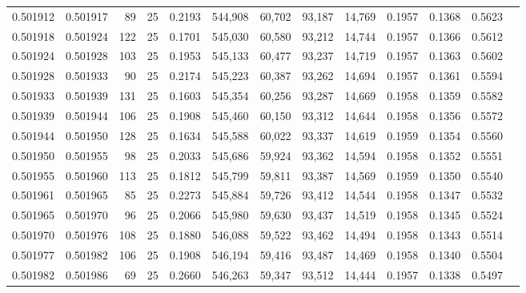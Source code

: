 \begin{tabular}{rrrrrrrrrrrrr}
0.501912 & 0.501917 &  89 &  25 &                                     0.2193 & 544,908 &  60,702 &  93,187 &  14,769 & 0.1957 & 0.1368 & 0.5623 \\
0.501918 & 0.501924 & 122 &  25 &                                     0.1701 & 545,030 &  60,580 &  93,212 &  14,744 & 0.1957 & 0.1366 & 0.5612 \\
0.501924 & 0.501928 & 103 &  25 &                                     0.1953 & 545,133 &  60,477 &  93,237 &  14,719 & 0.1957 & 0.1363 & 0.5602 \\
0.501928 & 0.501933 &  90 &  25 &                                     0.2174 & 545,223 &  60,387 &  93,262 &  14,694 & 0.1957 & 0.1361 & 0.5594 \\
0.501933 & 0.501939 & 131 &  25 &                                     0.1603 & 545,354 &  60,256 &  93,287 &  14,669 & 0.1958 & 0.1359 & 0.5582 \\
0.501939 & 0.501944 & 106 &  25 &                                     0.1908 & 545,460 &  60,150 &  93,312 &  14,644 & 0.1958 & 0.1356 & 0.5572 \\
0.501944 & 0.501950 & 128 &  25 &                                     0.1634 & 545,588 &  60,022 &  93,337 &  14,619 & 0.1959 & 0.1354 & 0.5560 \\
0.501950 & 0.501955 &  98 &  25 &                                     0.2033 & 545,686 &  59,924 &  93,362 &  14,594 & 0.1958 & 0.1352 & 0.5551 \\
0.501955 & 0.501960 & 113 &  25 &                                     0.1812 & 545,799 &  59,811 &  93,387 &  14,569 & 0.1959 & 0.1350 & 0.5540 \\
0.501961 & 0.501965 &  85 &  25 &                                     0.2273 & 545,884 &  59,726 &  93,412 &  14,544 & 0.1958 & 0.1347 & 0.5532 \\
0.501965 & 0.501970 &  96 &  25 &                                     0.2066 & 545,980 &  59,630 &  93,437 &  14,519 & 0.1958 & 0.1345 & 0.5524 \\
0.501970 & 0.501976 & 108 &  25 &                                     0.1880 & 546,088 &  59,522 &  93,462 &  14,494 & 0.1958 & 0.1343 & 0.5514 \\
0.501977 & 0.501982 & 106 &  25 &                                     0.1908 & 546,194 &  59,416 &  93,487 &  14,469 & 0.1958 & 0.1340 & 0.5504 \\
0.501982 & 0.501986 &  69 &  25 &                                     0.2660 & 546,263 &  59,347 &  93,512 &  14,444 & 0.1957 & 0.1338 & 0.5497 \\

\end{tabular}
